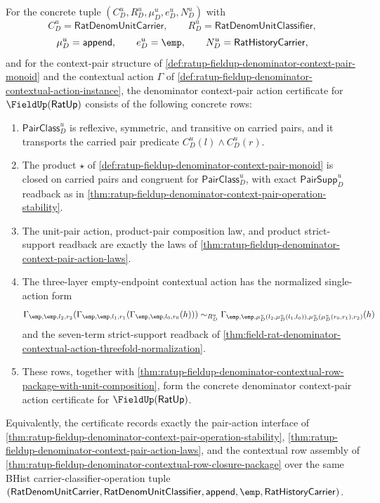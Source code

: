 \begin{theorem}
\label{thm:ratup-fieldup-denominator-context-pair-action-certificate}
For the concrete tuple
$(C_D^u,R_D^u,\mu_D^u,e_D^u,N_D^u)$ with
$$
C_D^u=\mathsf{RatDenomUnitCarrier},\qquad
R_D^u=\mathsf{RatDenomUnitClassifier},
$$
$$
\mu_D^u=\mathsf{append},\qquad e_D^u=\emp,\qquad
N_D^u=\mathsf{RatHistoryCarrier},
$$
and for the context-pair structure of
\autoref{def:ratup-fieldup-denominator-context-pair-monoid} and the contextual
action $\Gamma$ of
\autoref{def:ratup-fieldup-denominator-contextual-action-instance}, the
denominator context-pair action certificate for
$\FieldUp(\mathsf{RatUp})$ consists of the following concrete rows:
\begin{enumerate}
\item $\mathsf{PairClass}_D^u$ is reflexive, symmetric, and transitive on
carried pairs, and it transports the carried pair predicate
$C_D^u(l)\land C_D^u(r)$.
\item The product $\star$ of
\autoref{def:ratup-fieldup-denominator-context-pair-monoid} is closed on
carried pairs and congruent for $\mathsf{PairClass}_D^u$, with exact
$\mathsf{PairSupp}_D^u$ readback as in
\autoref{thm:ratup-fieldup-denominator-context-pair-operation-stability}.
\item The unit-pair action, product-pair composition law, and product
strict-support readback are exactly the laws of
\autoref{thm:ratup-fieldup-denominator-context-pair-action-laws}.
\item The three-layer empty-endpoint contextual action has the normalized
single-action form
$$
\Gamma_{\emp,\emp,l_2,r_2}
(\Gamma_{\emp,\emp,l_1,r_1}(\Gamma_{\emp,\emp,l_0,r_0}(h)))
\sim_{R_D^u}
\Gamma_{\emp,\emp,\mu_D^u(l_2,\mu_D^u(l_1,l_0)),
\mu_D^u(\mu_D^u(r_0,r_1),r_2)}(h)
$$
and the seven-term strict-support readback of
\autoref{thm:field-rat-denominator-contextual-action-threefold-normalization}.
\item These rows, together with
\autoref{thm:ratup-fieldup-denominator-contextual-row-package-with-unit-composition},
form the concrete denominator context-pair action certificate for
$\FieldUp(\mathsf{RatUp})$.
\end{enumerate}
Equivalently, the certificate records exactly the pair-action interface of
\autoref{thm:ratup-fieldup-denominator-context-pair-operation-stability},
\autoref{thm:ratup-fieldup-denominator-context-pair-action-laws}, and the
contextual row assembly of
\autoref{thm:ratup-fieldup-denominator-contextual-row-closure-package} over the
same BHist carrier-classifier-operation tuple
$(\mathsf{RatDenomUnitCarrier},\mathsf{RatDenomUnitClassifier},
\mathsf{append},\emp,\mathsf{RatHistoryCarrier})$.
\end{theorem}
